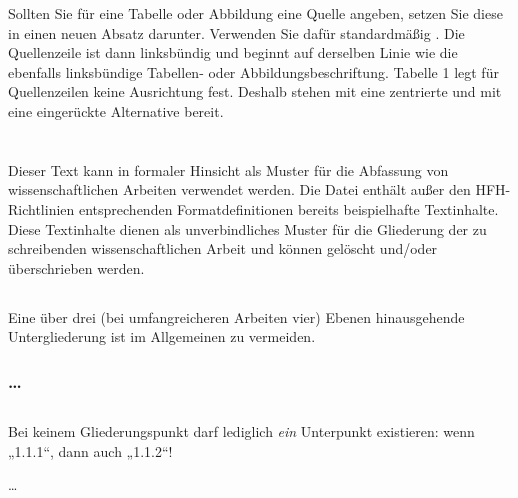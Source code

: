 Sollten Sie für eine Tabelle oder Abbildung eine Quelle angeben, setzen Sie
diese in einen neuen Absatz darunter. Verwenden Sie dafür standardmäßig
\texttt{\string\source}. Die Quellenzeile ist dann linksbündig und beginnt auf
derselben Linie wie die ebenfalls linksbündige Tabellen- oder
Abbildungsbeschriftung. Tabelle 1 legt für Quellenzeilen keine Ausrichtung
fest. Deshalb stehen mit \texttt{\string\sourcecentered} eine zentrierte und
mit \texttt{\string\sourceindented} eine eingerückte Alternative bereit.

\section{}

Dieser Text kann in formaler Hinsicht als Muster für die Abfassung von
wissenschaftlichen Arbeiten verwendet werden. Die Datei enthält außer den
HFH-Richtlinien entsprechenden Formatdefinitionen bereits beispielhafte
Textinhalte. Diese Textinhalte dienen als unverbindliches Muster für die
Gliederung der zu schreibenden wissenschaftlichen Arbeit und können gelöscht
und/oder überschrieben werden.

\subsection{}

Eine über drei (bei umfangreicheren Arbeiten vier) Ebenen hinausgehende
Untergliederung ist im Allgemeinen zu vermeiden.

\subsubsection{\dots}

\subsection{}

Bei keinem Gliederungspunkt darf lediglich \textit{ein} Unterpunkt existieren:
wenn „1.1.1“, dann auch „1.1.2“!

\dots

\section{}

